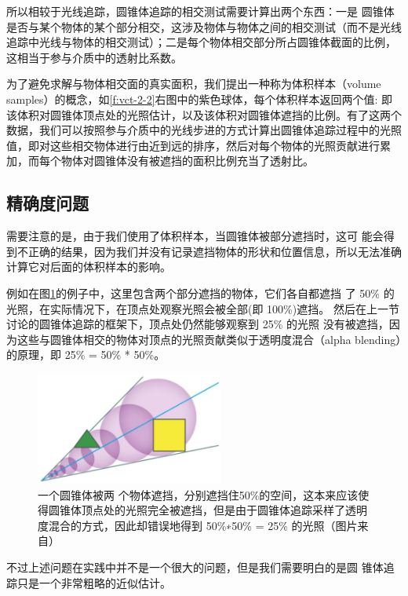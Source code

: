 所以相较于光线追踪，圆锥体追踪的相交测试需要计算出两个东西：一是 圆锥体是否与某个物体的某个部分相交，这涉及物体与物体之间的相交测试（而不是光线追踪中光线与物体的相交测试）；二是每个物体相交部分所占圆锥体截面的比例，这相当于参与介质中的透射比系数。

为了避免求解与物体相交面的真实面积，我们提出一种称为体积样本（volume samples）的概念，如\ref{f:vct-2-2}右图中的紫色球体，每个体积样本返回两个值: 即该体积对圆锥体顶点处的光照估计，以及该体积对圆锥体遮挡的比例。有了这两个数据，我们可以按照参与介质中的光线步进的方式计算出圆锥体追踪过程中的光照值，即对这些相交物体进行由近到远的排序，然后对每个物体的光照贡献进行累加，而每个物体对圆锥体没有被遮挡的面积比例充当了透射比。



\subsection{精确度问题}
需要注意的是，由于我们使用了体积样本，当圆锥体被部分遮挡时，这可 能会得到不正确的结果，因为我们并没有记录遮挡物体的形状和位置信息，所以无法准确计算它对后面的体积样本的影响。

例如在图\ref{f:vct-2-3}的例子中，这里包含两个部分遮挡的物体，它们各自都遮挡 了 50\% 的光照，在实际情况下，在顶点处观察光照会被全部(即 100\%)遮挡。 然后在上一节讨论的圆锥体追踪的框架下，顶点处仍然能够观察到 25\% 的光照 没有被遮挡，因为这些与圆锥体相交的物体对顶点的光照贡献类似于透明度混合（alpha blending）的原理，即 25\% = 50\% * 50\%。

\begin{figure}
\sidecaption
	\includegraphics[width=0.55\textwidth]{figures/vct/vct-2-3}
	\caption{一个圆锥体被两 个物体遮挡，分别遮挡住50\%的空间，这本来应该使得圆锥体顶点处的光照完全被遮挡，但是由于圆锥体追踪采样了透明度混合的方式，因此却错误地得到 50\%∗50\% = 25\% 的光照（图片来自\cite{a:TheTechnologyofTheTomorrowChildren}）}
	\label{f:vct-2-3}
\end{figure}

不过上述问题在实践中并不是一个很大的问题，但是我们需要明白的是圆 锥体追踪只是一个非常粗略的近似估计。




